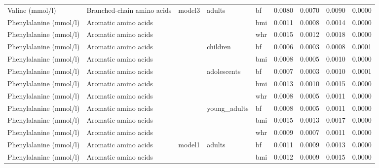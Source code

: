 \documentclass[11pt,twoside]{bristolthesis}
\begin{document}
\begin{longtable}[t]{lllllrrrr}
Valine (mmol/l) & Branched-chain amino acids & \multirow{-8}{*}{\raggedright\arraybackslash model3} & \multirow{-3}{*}{\raggedright\arraybackslash adults} & bf & 0.0080 & 0.0070 & 0.0090 & 0.0000\\
\cmidrule{1-9}\pagebreak[0]
Phenylalanine (mmol/l) & Aromatic amino acids &  &  & bmi & 0.0011 & 0.0008 & 0.0014 & 0.0000\\
\cmidrule{1-2}
\cmidrule{5-9}\nopagebreak
Phenylalanine (mmol/l) & Aromatic amino acids &  &  & whr & 0.0015 & 0.0012 & 0.0018 & 0.0000\\
\cmidrule{1-2}
\cmidrule{5-9}\nopagebreak
Phenylalanine (mmol/l) & Aromatic amino acids &  & \multirow{-3}{*}{\raggedright\arraybackslash children} & bf & 0.0006 & 0.0003 & 0.0008 & 0.0001\\
\cmidrule{1-2}
\cmidrule{4-9}\nopagebreak
Phenylalanine (mmol/l) & Aromatic amino acids &  &  & bmi & 0.0008 & 0.0005 & 0.0010 & 0.0000\\
\cmidrule{1-2}
\cmidrule{5-9}\nopagebreak
Phenylalanine (mmol/l) & Aromatic amino acids &  & \multirow{-2}{*}{\raggedright\arraybackslash adolescents} & bf & 0.0007 & 0.0003 & 0.0010 & 0.0001\\
\cmidrule{1-2}
\cmidrule{4-9}\nopagebreak
Phenylalanine (mmol/l) & Aromatic amino acids &  &  & bmi & 0.0013 & 0.0010 & 0.0015 & 0.0000\\
\cmidrule{1-2}
\cmidrule{5-9}\nopagebreak
Phenylalanine (mmol/l) & Aromatic amino acids &  &  & whr & 0.0008 & 0.0005 & 0.0011 & 0.0000\\
\cmidrule{1-2}
\cmidrule{5-9}\nopagebreak
Phenylalanine (mmol/l) & Aromatic amino acids &  & \multirow{-3}{*}{\raggedright\arraybackslash young\_adults} & bf & 0.0008 & 0.0005 & 0.0011 & 0.0000\\
\cmidrule{1-2}
\cmidrule{4-9}\nopagebreak
Phenylalanine (mmol/l) & Aromatic amino acids &  &  & bmi & 0.0015 & 0.0013 & 0.0017 & 0.0000\\
\cmidrule{1-2}
\cmidrule{5-9}\nopagebreak
Phenylalanine (mmol/l) & Aromatic amino acids &  &  & whr & 0.0009 & 0.0007 & 0.0011 & 0.0000\\
\cmidrule{1-2}
\cmidrule{5-9}\nopagebreak
Phenylalanine (mmol/l) & Aromatic amino acids & \multirow{-11}{*}{\raggedright\arraybackslash model1} & \multirow{-3}{*}{\raggedright\arraybackslash adults} & bf & 0.0011 & 0.0009 & 0.0013 & 0.0000\\
\cmidrule{1-9}\pagebreak[0]
Phenylalanine (mmol/l) & Aromatic amino acids &  &  & bmi & 0.0012 & 0.0009 & 0.0015 & 0.0000\\

\end{longtable}
\end{document}
